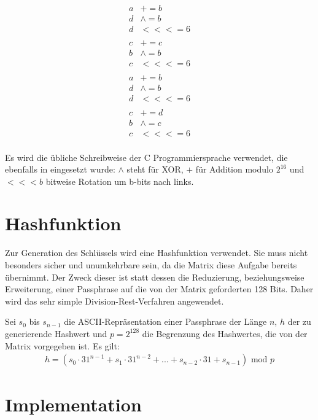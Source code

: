 \documentclass[10pt,a4paper]{article}
\begin{document}
\begin{align*}
    a & +=       b \\
    d & \wedge = b \\
    d & <<<=     6 \\
      &            \\
    c & +=       c \\
    b & \wedge = b \\
    c & <<<=     6 \\
      &            \\
    a & +=       b \\
    d & \wedge = b \\
    d & <<<=     6 \\
      &            \\
    c & +=       d \\
    b & \wedge = c \\
    c & <<<=     6 \\
\end{align*}

Es wird die übliche Schreibweise der C Programmiersprache verwendet, die ebenfalls in \cite{Bernstein2008} eingesetzt wurde:
$\wedge$ steht für XOR, $+$ für Addition modulo $2^{16}$ und $<<<b$ bitweise Rotation um b-bits nach links.

\section{Hashfunktion}

Zur Generation des Schlüssels wird eine Hashfunktion verwendet.
Sie muss nicht besonders sicher und unumkehrbare sein, da die Matrix diese Aufgabe bereits übernimmt.
Der Zweck dieser ist statt dessen die Reduzierung, beziehungsweise Erweiterung, einer Passphrase auf die von der Matrix geforderten 128 Bits.
Daher wird das sehr simple Division-Rest-Verfahren angewendet.

Sei $s_0$ bis $s_{n-1}$ die ASCII-Repräsentation einer Passphrase der Länge $n$, $h$ der zu generierende Hashwert und $p = 2^{128}$ die Begrenzung des Hashwertes, die von der Matrix vorgegeben ist.
Es gilt:
\begin{align*}
    h = \left( s_0 \cdot 31^{n-1} + s_1 \cdot 31^{n-2} + ... + s_{n-2} \cdot 31 + s_{n-1}\right)\text{ mod } p
\end{align*}

\section{Implementation}
\end{document}
